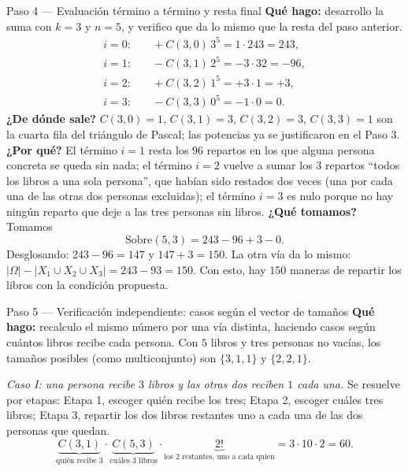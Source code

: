 \documentclass[11pt]{article}
\begin{document}
\begin{sol}
\begin{paso}{Paso 4 --- Evaluación término a término y resta final}
\textbf{Qué hago:} desarrollo la suma con $k=3$ y $n=5$, y verifico que da lo mismo que la resta del paso anterior.
\[
\begin{aligned}
i=0:&\quad +C(3,0)\,3^5=1\cdot 243=243,\\
i=1:&\quad -C(3,1)\,2^5=-3\cdot 32=-96,\\
i=2:&\quad +C(3,2)\,1^5=+3\cdot 1=+3,\\
i=3:&\quad -C(3,3)\,0^5=-1\cdot 0=0 .
\end{aligned}
\]
\textbf{¿De dónde sale?} $C(3,0)=1$, $C(3,1)=3$, $C(3,2)=3$, $C(3,3)=1$ son la cuarta fila del triángulo de Pascal; las potencias ya se justificaron en el Paso 3.
\textbf{¿Por qué?} El término $i=1$ resta los $96$ repartos en los que alguna persona concreta se queda sin nada; el término $i=2$ vuelve a sumar los $3$ repartos ``todos los libros a una sola persona'', que habían sido restados dos veces (una por cada una de las otras dos personas excluidas); el término $i=3$ es nulo porque no hay ningún reparto que deje a las tres personas sin libros.
\textbf{¿Qué tomamos?} Tomamos
\[
\text{Sobre}(5,3)=243-96+3-0 .
\]
Desglosando: $243-96=147$ y $147+3=150$. La otra vía da lo mismo: $|\Omega|-\bigl|X_1\cup X_2\cup X_3\bigr|=243-93=150$. Con esto, hay $150$ maneras de repartir los libros con la condición propuesta.
\end{paso}

\begin{paso}{Paso 5 --- Verificación independiente: casos según el vector de tamaños}
\textbf{Qué hago:} recalculo el mismo número por una vía distinta, haciendo casos según cuántos libros recibe cada persona. Con $5$ libros y tres personas no vacías, los tamaños posibles (como multiconjunto) son $\{3,1,1\}$ y $\{2,2,1\}$.

\medskip
\emph{Caso I: una persona recibe $3$ libros y las otras dos reciben $1$ cada una.} Se resuelve por etapas: Etapa 1, escoger quién recibe los tres; Etapa 2, escoger cuáles tres libros; Etapa 3, repartir los dos libros restantes uno a cada una de las dos personas que quedan.
\[
\underbrace{C(3,1)}_{\text{quién recibe }3}\cdot\underbrace{C(5,3)}_{\text{cuáles 3 libros}}\cdot\underbrace{2!}_{\text{los 2 restantes, uno a cada quien}}=3\cdot 10\cdot 2=60 .
\]


\end{paso}
\end{sol}
\end{document}
